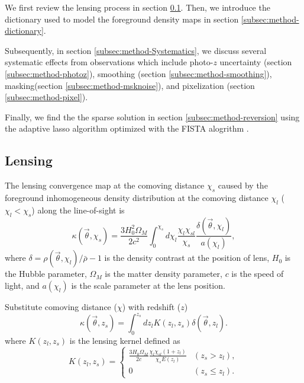 \documentclass[twocolumn]{aastex62}
\begin{document}
We first review the lensing process in section \ref{subsec:method-delta2shear}.
Then, we introduce the dictionary used to model the foreground density maps in section \ref{subsec:method-dictionary}.

Subsequently, in section \ref{subsec:method-Systematics}, we discuss several systematic effects from observations which 
include photo-$z$ uncertainty (section \ref{subsec:method-photoz}),
smoothing (section \ref{subsec:method-smoothing}),
masking(section \ref{subsec:method-msknoise}),
and pixelization (section \ref{subsec:method-pixel}).

Finally, we find the the sparse solution in section \ref{subsec:method-reversion} using the adaptive lasso algorithm 
\citep{AdaLASSO-Zou2006} optimized with the FISTA alogrithm \citep{FISTA-Beck2009}.


\subsection{Lensing}
\label{subsec:method-delta2shear}

The lensing convergence map at the comoving distance $\chi_s$ caused by the foreground inhomogeneous
density distribution at the comoving distance $\chi_l$ ($\chi_l< \chi_s$) along the line-of-sight is
\citep{LSS-massMap-Glimpse3D-Leonard2014}
\begin{equation}
\kappa(\vec{\theta},\chi_s)=\frac{3H_0^2\Omega_M}{2 c^2} \int_0^{\chi_s} d\chi_l \frac{\chi_l \chi_{sl}}{\chi_s}
\frac{\delta(\vec{\theta},\chi_l)}{a(\chi_l)},
\end{equation}
where $\delta=\rho(\vec{\theta},\chi_l)/\bar{\rho}-1$ is the density contrast
at the position of lens, $H_0$ is the Hubble parameter, $\Omega_M$ is the matter density parameter, $c$ is the speed
of light, and $a(\chi_l)$ is the scale parameter at the lens position.

Substitute comoving distance ($\chi$) with redshift ($z$)
\begin{equation}\label{eq-delta2kappa}
\kappa(\vec{\theta},z_s)=\int_0^{z_s} dz_l K(z_l,z_s)\delta(\vec{\theta},z_l).
\end{equation}
where $K(z_l,z_s)$ is the lensing kernel defined as
\begin{equation}
K(z_l,z_s) =
\begin{cases}
\frac{3H_0\Omega_M}{2 c} \frac{\chi_l \chi_{sl} (1+z_l)}{\chi_{s} E\left(z_l\right)} & (z_s>z_l),\\
0&(z_s \leq z_l).
\end{cases}
\end{equation}
\end{document}
